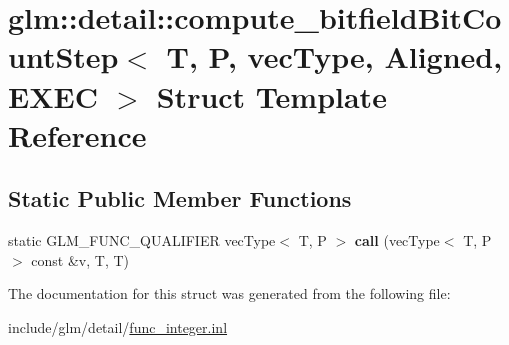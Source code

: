 \hypertarget{structglm_1_1detail_1_1compute__bitfieldBitCountStep}{}\section{glm\+:\+:detail\+:\+:compute\+\_\+bitfield\+Bit\+Count\+Step$<$ T, P, vec\+Type, Aligned, E\+X\+EC $>$ Struct Template Reference}
\label{structglm_1_1detail_1_1compute__bitfieldBitCountStep}
\subsection*{Static Public Member Functions}
\begin{DoxyCompactItemize}
\item 
\mbox{\label{structglm_1_1detail_1_1compute__bitfieldBitCountStep_a8683ebf8b1233db53ad5d99dbc1a6317}} 
static G\+L\+M\+\_\+\+F\+U\+N\+C\+\_\+\+Q\+U\+A\+L\+I\+F\+I\+ER vec\+Type$<$ T, P $>$ {\bfseries call} (vec\+Type$<$ T, P $>$ const \&v, T, T)
\end{DoxyCompactItemize}


The documentation for this struct was generated from the following file\+:\begin{DoxyCompactItemize}
\item 
include/glm/detail/\hyperlink{func__integer_8inl}{func\+\_\+integer.\+inl}\end{DoxyCompactItemize}
